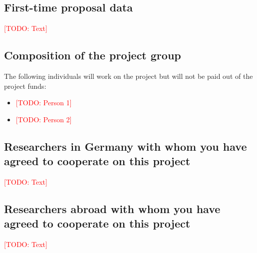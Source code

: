 \documentclass[american,firsttime]{dfgproposal}
\newcommand{\todo}[1]{\xspace{\textcolor{red}{[TODO: #1]}}\xspace}
\begin{document}
	\subsection{First-time proposal data}
	\todo{Text}
	
	
	
	\subsection{Composition of the project group}
	The following individuals will work on the project but will not be paid out of
	the project funds:
	\begin{itemize}
		\item \todo{Person 1}
		\item \todo{Person 2}
	\end{itemize}
	
	
	\subsection{Researchers in Germany with whom you have agreed to cooperate on this project}
	\todo{Text}
	
	\subsection{Researchers abroad with whom you have agreed to cooperate on this project}
	\todo{Text}
	
\end{document}
